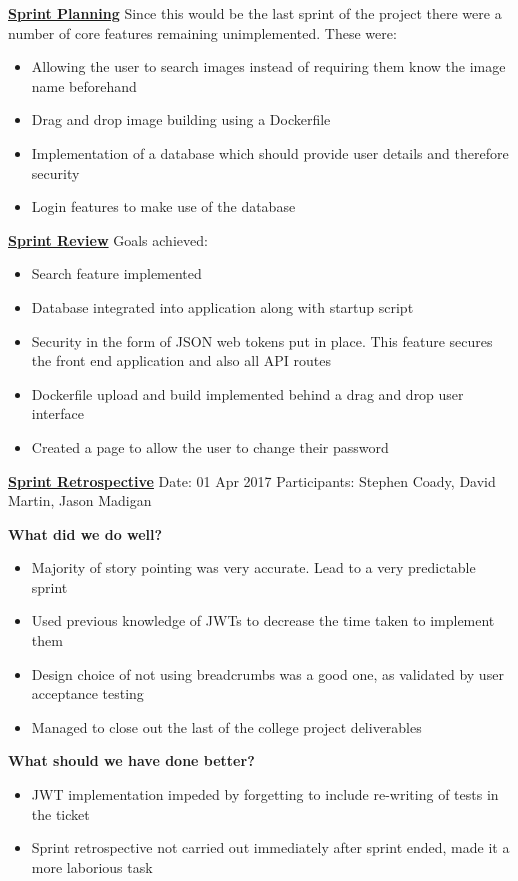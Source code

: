 \underline{\textbf{Sprint Planning}}\newline
Since this would be the last sprint of the project there were a number of core features remaining unimplemented. These were:
\begin{itemize}
	\item Allowing the user to search images instead of requiring them know the image name beforehand
	\item Drag and drop image building using a \gls{Dockerfile}
	\item Implementation of a database which should provide user details and therefore security
	\item Login features to make use of the database
\end{itemize}

\underline{\textbf{Sprint Review}}\newline
Goals achieved:
\begin{itemize}
	\item Search feature implemented
	\item Database integrated into application along with startup script
	\item Security in the form of JSON web tokens put in place. This feature secures the front end application and also all API routes
	\item Dockerfile upload and build implemented behind a drag and drop user interface
	\item Created a page to allow the user to change their password
\end{itemize}

\underline{\textbf{Sprint Retrospective}}\newline
Date: 01 Apr 2017
Participants: Stephen Coady, David Martin, Jason Madigan

\textbf{What did we do well?}
\begin{itemize}
	\item Majority of story pointing was very accurate. Lead to a very predictable sprint
	\item Used previous knowledge of JWTs to decrease the time taken to implement them
	\item Design choice of not using breadcrumbs was a good one, as validated by user acceptance testing
	\item Managed to close out the last of the college project deliverables
\end{itemize}
\textbf{What should we have done better?}
\begin{itemize}
	\item JWT implementation impeded by forgetting to include re-writing of tests in the ticket
	\item Sprint retrospective not carried out immediately after sprint ended, made it a more laborious task
\end{itemize}

